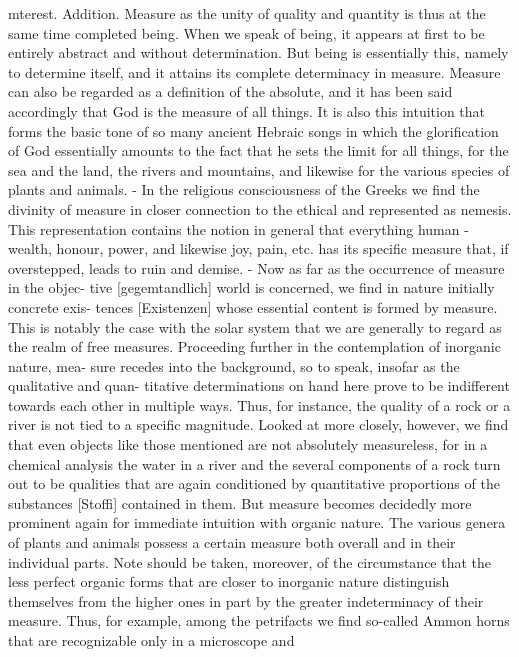 {{mterest. Addition. Measure as the unity of quality and quantity is thus at the same time
completed being. When we speak of being, it appears at first to be entirely abstract
and without determination. But being is essentially this, namely to determine
itself, and it attains its complete determinacy in measure. Measure can also be
regarded as a definition of the absolute, and it has been said accordingly that
God is the measure of all things. It is also this intuition that forms the basic tone
of so many ancient Hebraic songs in which the glorification of God essentially
amounts to the fact that he sets the limit for all things, for the sea and the land, the
rivers and mountains, and likewise for the various species of plants and animals. -
In the religious consciousness of the Greeks we find the divinity of measure in
closer connection to the ethical and represented as nemesis. This representation
contains the notion in general that everything human - wealth, honour, power,
and likewise joy, pain, etc. has its specific measure that, if overstepped, leads
to ruin and demise. - Now as far as the occurrence of measure in the objec-
tive [gegemtandlich] world is concerned, we find in nature initially concrete exis-
tences [Existenzen] whose essential content is formed by measure. This is notably
the case with the solar system that we are generally to regard as the realm of
free measures. Proceeding further in the contemplation of inorganic nature, mea-
sure recedes into the background, so to speak, insofar as the qualitative and quan-
titative determinations on hand here prove to be indifferent towards each other in
multiple ways. Thus, for instance, the quality of a rock or a river is not tied to a
specific magnitude. Looked at more closely, however, we find that even objects like
those mentioned are not absolutely measureless, for in a chemical analysis the water
in a river and the several components of a rock turn out to be qualities that are
again conditioned by quantitative proportions of the substances [Stoffi] contained
in them. But measure becomes decidedly more prominent again for immediate
intuition with organic nature. The various genera of plants and animals possess a
certain measure both overall and in their individual parts. Note should be taken,
moreover, of the circumstance that the less perfect organic forms that are closer
to inorganic nature distinguish themselves from the higher ones in part by the
greater indeterminacy of their measure. Thus, for example, among the petrifacts
we find so-called Ammon horns that are recognizable only in a microscope and
}}

